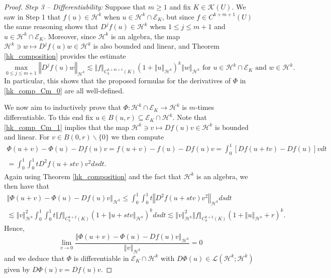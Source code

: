 \documentclass[10pt,a4paper]{amsart}
\theoremstyle{plain}
\theoremstyle{definition}
\theoremstyle{remark}
\def\L{\mathcal{L}}
\def\h{\mathcal{H}}
\def\ls{\lesssim}
\providecommand{\norm}[1]{\left\Vert#1\right\Vert}
\begin{document}
\begin{proof}
\emph{Step 3 -- Differentiability:}  Suppose that $m\ge 1$ and fix $K \in \mathcal{K}(U)$.   We saw in Step 1 that $f(u) \in \h^k$ when $u \in \h^k \cap \mathcal{E}_K$, but since $f \in C^{k+m+1}(U)$ the same reasoning shows that $D^j f(u) \in \h^k$ when $1 \le j \le m+1$ and $u \in \h^k \cap \mathcal{E}_K$.  Moreover, since $\h^k$ is an algebra, the map $\h^k \ni w \mapsto D^j f(u) w \in \h^k$ is also bounded and linear, and Theorem \ref{hk_composition} provides the estimate
\begin{equation}\label{hk_comp_Cm_1}
\max_{0\le j \le m+1} \norm{D^j f(u) w}_{\h^k} \ls \norm{f}_{C^{k+m+1}_b(K)}(1+\norm{u}_{\h^k})^k \norm{w}_{\h^k} \text{ for } u\in \h^k \cap \mathcal{E}_K \text{ and } w \in \h^k.
\end{equation}
In particular, this shows that the proposed formulas for the derivatives of $\Phi$ in \eqref{hk_comp_Cm_0} are all well-defined.

We now aim to inductively prove that $\Phi : \h^k \cap \mathcal{E}_K \to \h^k$ is $m$-times differentiable. To this end fix $u \in B(u,r) \subseteq \mathcal{E}_K \cap \h^k$.   Note that \eqref{hk_comp_Cm_1} implies that the map $\h^k \ni v \mapsto Df(u) v \in \h^k$ is bounded and linear. For $v \in B(0,r) \backslash \{0\}$ we then compute 
\begin{multline}
\Phi(u+v) - \Phi(u) - Df(u) v = f(u+v) - f(u) - Df(u) v = \int_0^1 [Df(u+tv) - Df(u)]v dt \\
= \int_0^1 \int_0^1 t D^2f(u+stv) v^2 ds dt. 
\end{multline}
Again using Theorem \ref{hk_composition} and the fact that $\h^k$ is an algebra, we then have that 
\begin{multline}
\norm{\Phi(u+v) - \Phi(u) - Df(u) v}_{\h^k} \le \int_0^1 \int_0^1 t \norm{D^2f(u+stv) v^2}_{\h^k} ds dt \\
\ls \norm{v}_{\h^k}^2 \int_0^1 \int_0^1 t \norm{f}_{C^{k+2}_b(K)}(1+ \norm{u+st v}_{\h^k} )^k dsdt 
\ls  \norm{v}_{\h^k}^2  \norm{f}_{C^{k+2}_b(K)} (1+ \norm{u}_{\h^k} + r)^k.
\end{multline}
Hence, 
\begin{equation}
 \lim_{v \to 0} \frac{\norm{\Phi(u+v) - \Phi(u) - Df(u) v}_{\h^k}}{\norm{v}_{\h^k}} =0
\end{equation}
and we deduce that $\Phi$ is differentiable in $\mathcal{E}_K \cap \h^k$ with $D\Phi(u) \in \L(\h^k;\h^k)$ given by $D\Phi(u)v = Df(u) v$.  


\end{proof}
\end{document}
